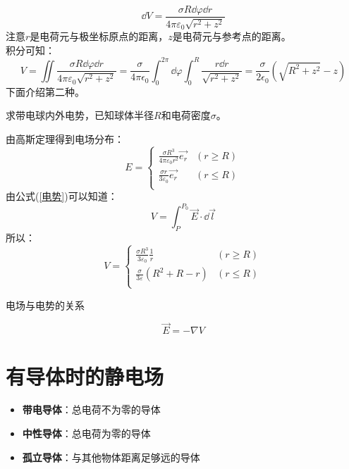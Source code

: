 \documentclass[cn,hazy,blue,14pt,normal]{elegantnote}
\numberwithin{equation}{section}
\begin{document}
$$
\dd V = \frac{\sigma R\dd\varphi\dd r}{4\pi\varepsilon_0\sqrt{r^2+z^2}} 
$$
注意$r$是电荷元与极坐标原点的距离，$z$是电荷元与参考点的距离。\\
积分可知：
$$
V = \iint \frac{\sigma R\dd\varphi\dd r}{4\pi\varepsilon_0\sqrt{r^2+z^2}} 
= \frac{\sigma}{4\pi\epsilon_0}\int_{0}^{2\pi}\dd\varphi\int_{0}^{R}\frac{r\dd r}{\sqrt{r^2+z^2}} 
= \frac{\sigma}{2\epsilon_0}(\sqrt{R^2+z^2}-z)
$$
下面介绍第二种。
\begin{example}
    求带电球内外电势，已知球体半径$R$和电荷密度$\sigma$。
\end{example}
由高斯定理得到电场分布：
$$
E=
\left \{
    \begin{array}{ll}
        \frac{\sigma R^3}{4\pi\varepsilon_0r^2}\vec{e_r} &(r \geqslant R)\\
        \frac{\sigma r}{3\varepsilon_0}\vec{e_r} &(r \leqslant R)\\
    \end{array}
\right .
$$
由公式(\ref{电势})可以知道：
$$
V = \int_{P}^{P_0}\vec{E}\cdot\dd\vec{l}
$$
所以：
$$
V=
\left \{
    \begin{array}{ll}
        \frac{\sigma R^3}{3\varepsilon_0}\frac 1r & (r \geqslant R)\\
        \frac{\sigma}{3\varepsilon}(R^2+R-r) & (r \leqslant R)\\
    \end{array}
\right .
$$

\begin{theorem}
  电场与电势的关系
\end{theorem}
\begin{equation}\label{电场与电势关系}
  \vec{E}=-\nabla V
\end{equation}

\newpage
\section{有导体时的静电场}
\begin{itemize}
	\item \textbf{带电导体}：总电荷不为零的导体
	\item \textbf{中性导体}：总电荷为零的导体
	\item \textbf{孤立导体}：与其他物体距离足够远的导体
\end{itemize}
\newpage
\end{document}

